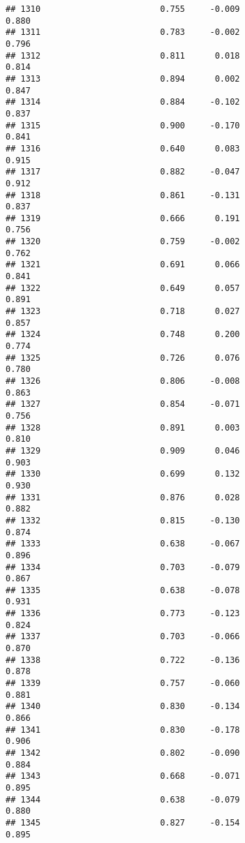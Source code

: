 \documentclass[
]{article}
\begin{document}
\begin{verbatim}
## 1310                        0.755     -0.009                     0.880
## 1311                        0.783     -0.002                     0.796
## 1312                        0.811      0.018                     0.814
## 1313                        0.894      0.002                     0.847
## 1314                        0.884     -0.102                     0.837
## 1315                        0.900     -0.170                     0.841
## 1316                        0.640      0.083                     0.915
## 1317                        0.882     -0.047                     0.912
## 1318                        0.861     -0.131                     0.837
## 1319                        0.666      0.191                     0.756
## 1320                        0.759     -0.002                     0.762
## 1321                        0.691      0.066                     0.841
## 1322                        0.649      0.057                     0.891
## 1323                        0.718      0.027                     0.857
## 1324                        0.748      0.200                     0.774
## 1325                        0.726      0.076                     0.780
## 1326                        0.806     -0.008                     0.863
## 1327                        0.854     -0.071                     0.756
## 1328                        0.891      0.003                     0.810
## 1329                        0.909      0.046                     0.903
## 1330                        0.699      0.132                     0.930
## 1331                        0.876      0.028                     0.882
## 1332                        0.815     -0.130                     0.874
## 1333                        0.638     -0.067                     0.896
## 1334                        0.703     -0.079                     0.867
## 1335                        0.638     -0.078                     0.931
## 1336                        0.773     -0.123                     0.824
## 1337                        0.703     -0.066                     0.870
## 1338                        0.722     -0.136                     0.878
## 1339                        0.757     -0.060                     0.881
## 1340                        0.830     -0.134                     0.866
## 1341                        0.830     -0.178                     0.906
## 1342                        0.802     -0.090                     0.884
## 1343                        0.668     -0.071                     0.895
## 1344                        0.638     -0.079                     0.880
## 1345                        0.827     -0.154                     0.895

\end{verbatim}
\end{document}
